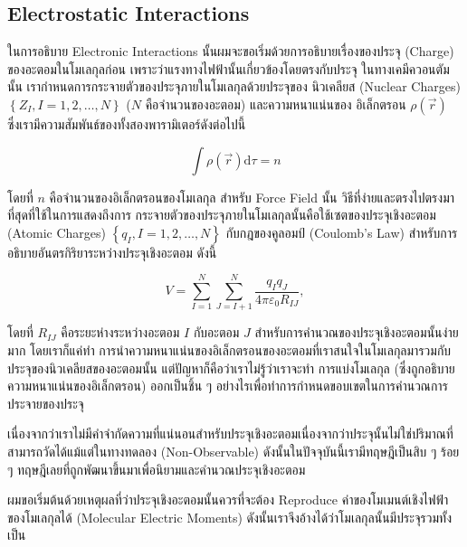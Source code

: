 \subsection{Electrostatic Interactions}

ในการอธิบาย Electronic Interactions นั้นผมจะขอเริ่มด้วยการอธิบายเรื่องของประจุ (Charge) ของอะตอมในโมเลกุลก่อน
เพราะว่าแรงทางไฟฟ้านั้นเกี่ยวข้องโดยตรงกับประจุ ในทางเคมีควอนตัมนั้น เรากำหนดการกระจายตัวของประจุภายในโมเลกุลด้วยประจุของ%
นิวเคลียส (Nuclear Charges) $\left\{Z_I, I=1,2, \ldots, N\right\}$ ($N$ คือจำนวนของอะตอม) และความหนาแน่นของ%
อิเล็กตรอน $\rho(\vec{r})$ ซึ่งเรามีความสัมพันธ์ของทั้งสองพารามิเตอร์ดังต่อไปนี้

\begin{equation}
    \int \rho(\vec{r}) \mathrm{d} \tau
    =
    n
\end{equation}

\noindent โดยที่ $n$ คือจำนวนของอิเล็กตรอนของโมเลกุล สำหรับ Force Field นั้น วิธีที่ง่ายและตรงไปตรงมาที่สุดที่ใช้ในการแสดงถึงการ%
กระจายตัวของประจุภายในโมเลกุลนั้นคือใช้เซตของประจุเชิงอะตอม (Atomic Charges) $\left\{q_I, I=1,2, \ldots, N\right\}$
กับกฎของคูลอมป์ (Coulomb's Law) สำหรับการอธิบายอันตรกิริยาระหว่างประจุเชิงอะตอม ดังนี้

\begin{equation}
    V
    =
    \sum_{I=1}^N \sum_{J=I+1}^N \frac{q_I q_J}{4 \pi \varepsilon_0 R_{I J}},
\end{equation}

\noindent โดยที่ $R_{I J}$ คือระยะห่างระหว่างอะตอม $I$ กับอะตอม $J$ สำหรับการคำนวณของประจุเชิงอะตอมนั้นง่ายมาก โดยเราก็แค่ทำ%
การนำความหนาแน่นของอิเล็กตรอนของอะตอมที่เราสนใจในโมเลกุลมารวมกับประจุของนิวเคลียสของอะตอมนั้น แต่ปัญหาก็คือว่าเราไม่รู้ว่าเราจะทำ%
การแบ่งโมเลกุล (ซึ่งถูกอธิบายความหนาแน่นของอิเล็กตรอน) ออกเป็นชิ้น ๆ อย่างไรเพื่อทำการกำหนดขอบเขตในการคำนวณการประจายของประจุ

เนื่องจากว่าเราไม่มีคำจำกัดความที่แน่นอนสำหรับประจุเชิงอะตอมเนื่องจากว่าประจุนั้นไม่ใช่ปริมาณที่สามารถวัดได้แม้แต่ในทางทดลอง (Non-Observable)
ดังนั้นในปัจจุบันนี้เรามีทฤษฎีเป็นสิบ ๆ ร้อย ๆ ทฤษฎีเลยที่ถูกพัฒนาขึ้นมาเพื่อนิยามและคำนวณประจุเชิงอะตอม

ผมขอเริ่มต้นด้วยเหตุผลที่ว่าประจุเชิงอะตอมนั้นควรที่จะต้อง Reproduce ค่าของโมเมนต์เชิงไฟฟ้าของโมเลกุลได้ (Molecular Electric Moments)
ดังนั้นเราจึงอ้างได้ว่าโมเลกุลนั้นมีประจุรวมทั้งเป็น

